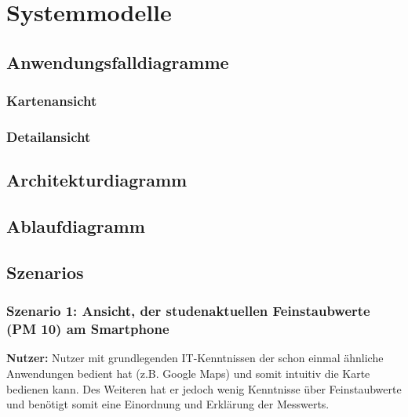 \section{Systemmodelle}

\subsection{Anwendungsfalldiagramme}

\subsubsection*{Kartenansicht}
\noindent{}

\subsubsection*{Detailansicht}
\noindent{}
\newpage

\subsection{Architekturdiagramm}

\noindent{}
\subsection{Ablaufdiagramm}

\noindent{}

\subsection{Szenarios}

\subsubsection*{Szenario 1: Ansicht, der studenaktuellen Feinstaubwerte (PM 10) am Smartphone}
\textbf{Nutzer:} Nutzer mit grundlegenden IT-Kenntnissen der schon einmal ähnliche Anwendungen bedient hat (z.B. Google Maps) 
und somit intuitiv die Karte bedienen kann. Des Weiteren hat er jedoch wenig Kenntnisse über Feinstaubwerte und benötigt somit 
eine Einordnung und Erklärung der \glspl{Messwert}.

